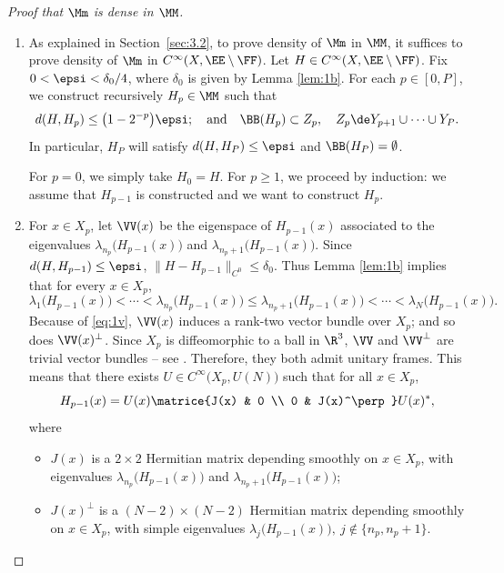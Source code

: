 \skpt
\begin{proof}[Proof that $\Mm$ is dense in $\MM$]
\begin{enumerate}
\item
As explained in Section~\ref{sec:3.2}, to prove density of $\Mm$ in $\MM$, it suffices to prove density of $\Mm$ in $C^\infty(X,\EE \setminus \FF)$. Let $H \in C^\infty(X,\EE \setminus \FF)$.
Fix $0 < \epsi < \delta_0/4$, where $\delta_0$ is given by Lemma \ref{lem:1b}. For each $p \in [0,P]$, we construct recursively $H_p \in \MM$ such that
\begin{equation*}
d(H, H_p) \leq \bigl(1-2^{-p}\bigr) \epsi ; \quad\text{and}\quad \BB(H_p) \subset Z_p, \quad Z_p \de Y_{p+1} \cup \dots \cup Y_P.
\end{equation*}
In particular, $H_P$ will satisfy $d(H,H_P) \leq \epsi$ and $\BB(H_P) = \emptyset$.

For $p=0$, we simply take $H_0 = H$. For $p \geq 1$, we proceed by induction: we assume that $H_{p-1}$ is constructed and we want to construct $H_p$.

\item
For $x \in X_p$, let $\VV(x)$ be the eigenspace of $H_{p-1}(x)$ associated to the eigenvalues $\lambda_{n_p}\bigl( H_{p-1}(x) \bigr)$ and $\lambda_{n_p+1}\bigl( H_{p-1}(x) \bigr)$. Since $d(H, H_{p-1}) \leq \epsi$, $\| H-H_{p-1}\|_{C^0} \leq \delta_0$. Thus Lemma \ref{lem:1b} implies that for every $x \in X_p$,
\begin{equation}\label{eq:1v}
\lambda_1\bigl( H_{p-1}(x) \bigr) \!<\! \cdots \!<\! \lambda_{n_p}\bigl( H_{p-1}(x) \bigr) \!\leq\! \lambda_{n_p+1}\bigl( H_{p-1}(x) \bigr) \!<\! \cdots \!<\! \lambda_N\bigl( H_{p-1}(x) \bigr).
\end{equation}
Because of \eqref{eq:1v}, $\VV(x)$ induces a rank-two vector bundle over $X_p$; and so does $\VV(x)^\perp$. Since $X_p$ is diffeomorphic to a ball in $\R^3$, $\VV$ and $\VV^\perp$ are trivial vector bundles -- see \eg \cite[\S1.3]{M01}. Therefore, they both admit unitary frames. This means that there exists $U \in C^\infty\bigl(X_p,U(N)\bigr)$ such that for all $x \in X_p$,
\begin{equation}\label{eq:1u}
H_{p-1}(x) = U(x) \matrice{J(x) & 0 \\ 0 & J(x)^\perp} U(x)^*,
\end{equation}
where
\begin{itemize}
\item $J(x)$ is a $2 \times 2$ Hermitian matrix depending smoothly on $x \in X_p$, with eigenvalues $\lambda_{n_p}\bigl( H_{p-1}(x) \bigr)$ and $\lambda_{n_p+1}\bigl( H_{p-1}(x) \bigr)$;
\item $J(x)^\perp$ is a $(N-2) \times (N-2)$ Hermitian matrix depending smoothly on $x \in X_p$, with simple eigenvalues $\lambda_j\bigl( H_{p-1}(x) \bigr), \ j \notin\{ n_p, n_p+1\}$.
\end{itemize}


\end{enumerate}
\end{proof}
